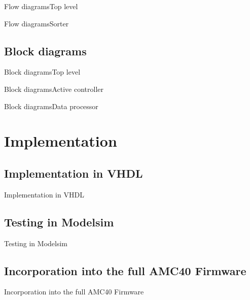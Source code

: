 \documentclass{beamer}
\begin{document}
\begin{frame}{Flow diagrams}{Top level}
\end{frame}

\begin{frame}{Flow diagrams}{Sorter}
\end{frame}


\subsection{Block diagrams}

\begin{frame}{Block diagrams}{Top level}
\end{frame}

\begin{frame}{Block diagrams}{Active controller}
\end{frame}

\begin{frame}{Block diagrams}{Data processor}
\end{frame}



\section{Implementation}

\subsection{Implementation in VHDL}

\begin{frame}{Implementation in VHDL}
\end{frame}


\subsection{Testing in Modelsim}

\begin{frame}{Testing in Modelsim}
\end{frame}


\subsection{Incorporation into the full AMC40 Firmware}

\begin{frame}{Incorporation into the full AMC40 Firmware}
\end{frame}
\end{document}
